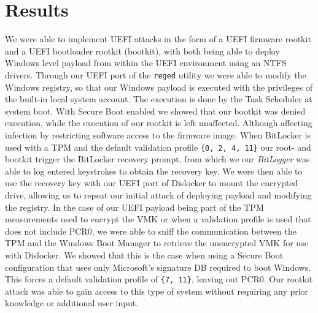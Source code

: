 
\chapter{Results}

We were able to implement \ac{UEFI} attacks in the form of a \ac{UEFI} firmware rootkit and a \ac{UEFI} bootloader rootkit (bootkit), with both being able to deploy Windows level payload from within the \ac{UEFI} environment using an \ac{NTFS} drivers.
Through our \ac{UEFI} port of the \lstinline{reged} utility we were able to modify the Windows registry, so that our Windows payload is executed with the privileges of the built-in local system account.
The execution is done by the Task Scheduler at system boot.
With Secure Boot enabled we showed that our bootkit was denied execution, while the execution of our rootkit is left unaffected. Although affecting infection by restricting software access to the firmware image.
When BitLocker is used with a \ac{TPM} and the default validation profile \lstinline|{0, 2, 4, 11}| our root- and bootkit trigger the BitLocker recovery prompt, from which we our \emph{BitLogger} was able to log entered keystrokes to obtain the recovery key. We were then able to use the recovery key with our \ac{UEFI} port of Dislocker to mount the encrypted drive, allowing us to repeat our initial attack of deploying payload and modifying the registry.
In the case of our \ac{UEFI} payload being part of the \ac{TPM} measurements used to encrypt the \ac{VMK} or when a validation profile is used that does not include \ac{PCR}0, we were able to sniff the communication between the \ac{TPM} and the Windows Boot Manager to retrieve the unencrypted \ac{VMK} for use with Dislocker.
We showed that this is the case when using a Secure Boot configuration that uses only Microsoft's signature \ac{DB} required to boot Windows. This forces a default validation profile of \lstinline|{7, 11}|, leaving out \ac{PCR}0.
Our rootkit attack was able to gain access to this type of system without requiring any prior knowledge or additional user input.
